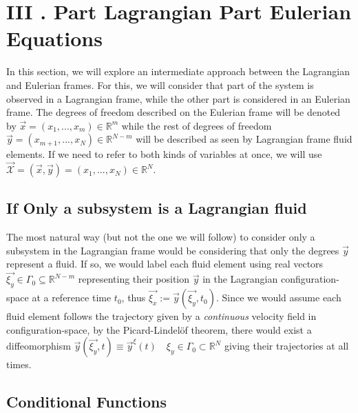 \documentclass[11pt, a4paper]{article} %
\newcommand{\R}{\mathbb{R}} %
\newcommand{\x}{\mathcal{X}}
\begin{document}
\section*{III . Part Lagrangian Part Eulerian Equations}
In this section, we will explore an intermediate approach between the Lagrangian and Eulerian frames. For this, we will consider that part of the system is observed in a Lagrangian frame, while the other part is considered in an Eulerian frame. The degrees of freedom described on the Eulerian frame will be denoted by $\vec{x}=(x_1,...,x_m)\in\R^m$ while the rest of degrees of freedom $\vec{y}=(x_{m+1},...,x_N)\in\R^{N-m}$ will be described as seen by Lagrangian frame fluid elements. If we need to refer to both kinds of variables at once, we will use $\vec{\x}=(\vec{x}, \vec{y})=(x_1,...,x_N)\in \R^N$.

\subsection*{If Only a subsystem is a Lagrangian fluid}

The most natural way (but not the one we will follow) to consider only a subsystem in the Lagrangian frame would be considering that only the degrees $\vec{y}$ represent a fluid. If so, we would label each fluid element using real vectors $\vec{\xi_y}\in\Gamma_0\subseteq \R^{N-m}$ representing their position $\vec{y}$ in the Lagrangian configuration-space at a reference time $t_0$, thus $\vec{\xi_x}:=\vec{y}( \vec{\xi_y},t_0)$. Since we would assume each fluid element follows the trajectory given by a {\em continuous} velocity field in configuration-space, by the Picard-Lindelöf theorem, there would exist a diffeomorphism $\vec{y}(\vec{\xi_y},t)\equiv \vec{y}^\xi(t) \quad \xi_y \in \Gamma_0 \subset \R^N$ giving their trajectories at all times. 

\subsection*{Conditional Functions}
\end{document}

